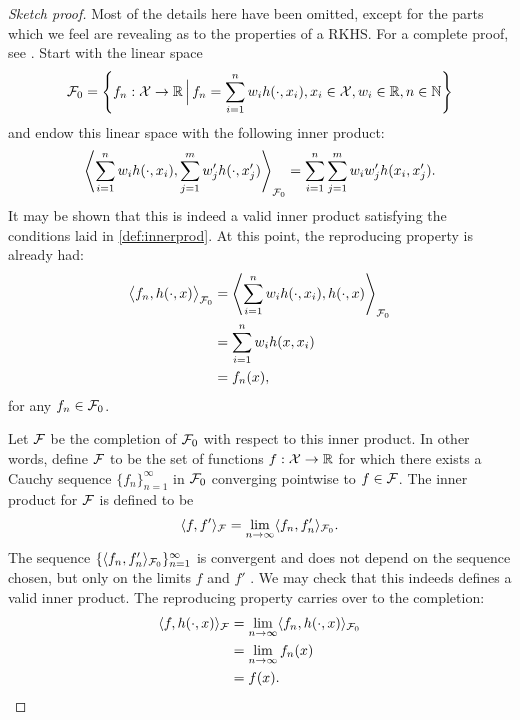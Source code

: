 \begin{proof}[Sketch proof]
  Most of the details here have been omitted, except for the parts which we feel are revealing as to the properties of a RKHS.
  For a complete proof, see \citet[Theorem 2.3]{gu2013smoothing}.
  Start with the linear space
  \[
    {\mathcal F}_0 = \left\{ f_n:{\mathcal X}\to\mathbb{R} \, \Big| \, f_n = \sum_{i=1}^n w_i h(\cdot,x_i), x_i\in{\mathcal X}, w_i\in\mathbb{R}, n\in\mathbb{N} \right\}
  \]
  and endow this linear space with the following inner product:
  \[\label{eq:rkhsinnerprod}
    \left\langle \sum_{i=1}^n w_i h(\cdot,x_i), \sum_{j=1}^m w_j' h(\cdot,x_j') \right\rangle_{{\mathcal F}_0} = \sum_{i=1}^n\sum_{j=1}^m w_i w_j' h(x_i,x_j').
  \]
  It may be shown that this is indeed a valid inner product satisfying the conditions laid in \cref{def:innerprod}.
  At this point, the reproducing property is already had:   \begin{align*}
    \big\langle f_n, h(\cdot,x) \big\rangle_{{\mathcal F}_0} 
    &= \left\langle \sum_{i=1}^n w_i h(\cdot,x_i), h(\cdot,x) \right\rangle_{{\mathcal F}_0} \\
    &= \sum_{i=1}^n w_i h(x,x_i) \\
    &= f_n(x),
  \end{align*}
  for any $f_n\in{\mathcal F}_0$.
  
  Let ${\mathcal F}$ be the completion of ${\mathcal F}_0$ with respect to this inner product.
  In other words, define ${\mathcal F}$ to be the set of functions $f:{\mathcal X}\to\mathbb{R}$ for which there exists a Cauchy sequence $\{f_n\}_{n=1}^\infty$ in ${\mathcal F}_0$ converging pointwise to $f \in {\mathcal F}$.
  The inner product for ${\mathcal F}$ is defined to be
  \[
    \langle f,f'\rangle_{\mathcal F} = \lim_{n\to\infty} \langle f_n,f_n'\rangle_{{\mathcal F}_0}.
  \]
  The sequence $\{ \langle f_n,f_n'\rangle_{{\mathcal F}_0} \}_{n=1}^\infty$ is convergent and does not depend on the sequence chosen, but only on the limits $f$ and $f'$ \citep[Lemma 5]{berlinet2011reproducing}.
  We may check that this indeeds defines a valid inner product.
  The reproducing property carries over to the completion:
  \begin{align*}
    \langle f,h(\cdot,x)\rangle_{\mathcal F} 
    &= \lim_{n\to\infty} \langle f_n,h(\cdot,x)\rangle_{{\mathcal F}_0} \\
    &= \lim_{n\to\infty} f_n(x) \\
    &= f(x).
  \end{align*}
  

\end{proof}
